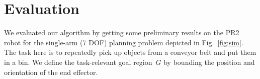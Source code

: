 \documentclass[letterpaper, 10 pt, conference]{ieeeconf}  %
\begin{document}


\section{Evaluation}
\begin{table}[tb]
    \caption{Experimental results comparing our method with \textsf{PRM}. The table shows the mean/worst-case planning times and success rates for our method and for \textsf{PRM} preprocessed with equal, double and quadruple the time that our method takes in precomputation (T = 1,128 seconds).}
    \label{tab:stats}
\end{table}

We evaluated our algorithm by getting some preliminary results on the PR2 robot for the single-arm (7 DOF) planning problem depicted in Fig.~\ref{fig:sim}. The task here is to repeatedly pick up objects from a conveyor belt and put them in a bin. 
We define the task-relevant goal region~$G$ by bounding the position and orientation of the end effector. 

\end{document}
